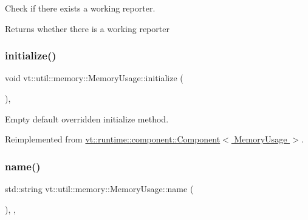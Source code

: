 Check if there exists a working reporter. 

\begin{DoxyReturn}{Returns}
whether there is a working reporter 
\end{DoxyReturn}
\mbox{\label{structvt_1_1util_1_1memory_1_1_memory_usage_add66c6cdabed24194310380c5a28951a}} 
\subsubsection{\texorpdfstring{initialize()}{initialize()}}
{\footnotesize\ttfamily void vt\+::util\+::memory\+::\+Memory\+Usage\+::initialize (\begin{DoxyParamCaption}{ }\end{DoxyParamCaption})\hspace{0.3cm}{\ttfamily [override]}, {\ttfamily [virtual]}}



Empty default overridden initialize method. 



Reimplemented from \hyperlink{structvt_1_1runtime_1_1component_1_1_component_a7f07384d294e59796add9ce6be2d6410}{vt\+::runtime\+::component\+::\+Component$<$ Memory\+Usage $>$}.

\mbox{\label{structvt_1_1util_1_1memory_1_1_memory_usage_abd58d8e05874fa3da64e15fef0b9e87f}} 
\subsubsection{\texorpdfstring{name()}{name()}}
{\footnotesize\ttfamily std\+::string vt\+::util\+::memory\+::\+Memory\+Usage\+::name (\begin{DoxyParamCaption}{ }\end{DoxyParamCaption})\hspace{0.3cm}{\ttfamily [inline]}, {\ttfamily [override]}, {\ttfamily [virtual]}}



